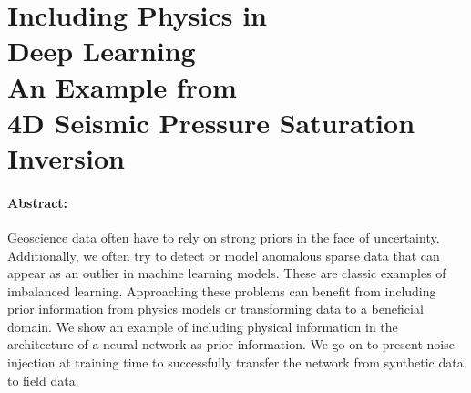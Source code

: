 \section[Including Physics in Deep Learning – An Example from 4D Seismic Pressure Saturation Inversion]{Including Physics in\\Deep Learning\\An Example from\\4D Seismic Pressure Saturation Inversion}

\paragraph{Abstract:} Geoscience data often have to rely on strong priors in the face of uncertainty. Additionally, we often try to detect or model anomalous sparse data that can appear as an outlier in machine learning models. These are classic examples of imbalanced learning. Approaching these problems can benefit from including prior information from physics models or transforming data to a beneficial domain. We show an example of including physical information in the architecture of a neural network as prior information. We go on to present noise injection at training time to successfully transfer the network from synthetic data to field data.

{\vfill\hfill\newline{}}



